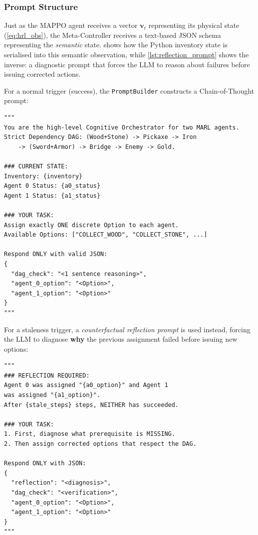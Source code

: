 \subsubsection{Prompt Structure}

Just as the MAPPO agent receives a vector $\mathbf{v}_t$ representing its
physical state (\cref{eq:hrl_obs}), the Meta-Controller receives a
text-based JSON schema representing the \emph{semantic} state.
 shows how the Python inventory state is serialised
into this semantic observation, while \cref{lst:reflection_prompt} shows
the inverse: a diagnostic prompt that forces the LLM to reason about
failures before issuing corrected actions.

For a normal trigger (success), the \texttt{PromptBuilder} constructs a
Chain-of-Thought prompt:
\begin{lstlisting}[style=llmprompt, caption={HRL prompt schema (from \texttt{prompt\_builder.py}).}, label={lst:hrl_prompt}]
"""
You are the high-level Cognitive Orchestrator for two MARL agents.
Strict Dependency DAG: (Wood+Stone) -> Pickaxe -> Iron
    -> (Sword+Armor) -> Bridge -> Enemy -> Gold.

### CURRENT STATE:
Inventory: {inventory}
Agent 0 Status: {a0_status}
Agent 1 Status: {a1_status}

### YOUR TASK:
Assign exactly ONE discrete Option to each agent.
Available Options: ["COLLECT_WOOD", "COLLECT_STONE", ...]

Respond ONLY with valid JSON:
{
  "dag_check": "<1 sentence reasoning>",
  "agent_0_option": "<Option>",
  "agent_1_option": "<Option>"
}
"""
\end{lstlisting}

For a staleness trigger, a \emph{counterfactual reflection prompt} is
used instead, forcing the LLM to diagnose \textbf{why} the previous
assignment failed before issuing new options:
\begin{lstlisting}[style=llmprompt, caption={Reflection prompt for stale options (from \texttt{prompt\_builder.py}).}, label={lst:reflection_prompt}]
"""
### REFLECTION REQUIRED:
Agent 0 was assigned "{a0_option}" and Agent 1
was assigned "{a1_option}".
After {stale_steps} steps, NEITHER has succeeded.

### YOUR TASK:
1. First, diagnose what prerequisite is MISSING.
2. Then assign corrected options that respect the DAG.

Respond ONLY with JSON:
{
  "reflection": "<diagnosis>",
  "dag_check": "<verification>",
  "agent_0_option": "<Option>",
  "agent_1_option": "<Option>"
}
"""
\end{lstlisting}

